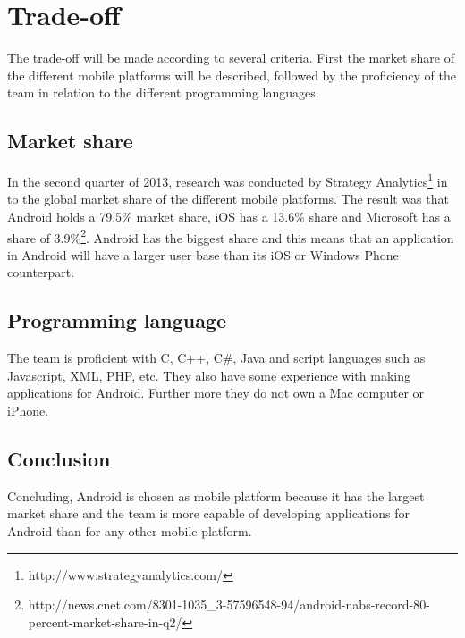 \section{Trade-off}
The trade-off will be made according to several criteria. First the market share of the different mobile platforms will be described, followed by the proficiency of the team in relation to the different programming languages. 

\subsection{Market share}
In the second quarter of 2013, research was conducted by Strategy Analytics\footnote{http://www.strategyanalytics.com/} in to the global market share of the different mobile platforms. The result was that Android holds a 79.5\% market share, iOS has a 13.6\% share and Microsoft has a share of 3.9\%\footnote{http://news.cnet.com/8301-1035\_3-57596548-94/android-nabs-record-80-percent-market-share-in-q2/}.  Android has the biggest share and this means that an application in Android will have a larger user base than its iOS or Windows Phone counterpart.

\subsection{Programming language}
The team is proficient with C, C++, C\#, Java and script languages such as Javascript, XML, PHP, etc. They also have some experience with making applications for Android. Further more they do not own a Mac computer or iPhone. 

\subsection{Conclusion}
Concluding, Android is chosen as mobile platform because it has the largest market share and the team is more capable of developing applications for Android than for any other mobile platform.